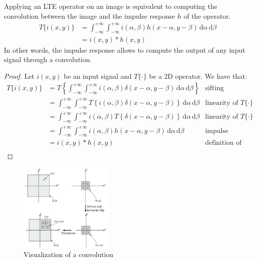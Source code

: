 \begin{theorem} 
    Applying an LTE operator on an image is equivalent to computing the convolution between the image and the impulse response $h$ of the operator.
    \[ 
        \begin{split}
            T\{ i(x, y) \} &= \int_{-\infty}^{+\infty}\int_{-\infty}^{+\infty} i(\alpha, \beta) h(x-\alpha, y-\beta) \,\text{d}\alpha\,\text{d}\beta \\
                &= i(x, y) * h(x, y) 
        \end{split}
    \]
    In other words, the impulse response allows to compute the output of any input signal through a convolution.
    \begin{proof}
        Let $i(x, y)$ be an input signal and $T\{ \cdot \}$ be a 2D operator.
        We have that:
        \begin{align*}
            T\{ i(x, y) \} 
                &= T\left\{ \int_{-\infty}^{+\infty}\int_{-\infty}^{+\infty} i(\alpha, \beta) \delta(x-\alpha, y-\beta) \,\text{d}\alpha\,\text{d}\beta \right\} 
                & \text{sifting property} \\
                &= \int_{-\infty}^{+\infty}\int_{-\infty}^{+\infty} T\left\{ i(\alpha, \beta) \delta(x-\alpha, y-\beta) \right\} \,\text{d}\alpha\,\text{d}\beta
                & \text{linearity of $T\{ \cdot \}$} \\
                &= \int_{-\infty}^{+\infty}\int_{-\infty}^{+\infty} i(\alpha, \beta) T\left\{ \delta(x-\alpha, y-\beta) \right\} \,\text{d}\alpha\,\text{d}\beta
                & \text{linearity of $T\{ \cdot \}$} \\
                &= \int_{-\infty}^{+\infty}\int_{-\infty}^{+\infty} i(\alpha, \beta) h(x-\alpha, y-\beta) \,\text{d}\alpha\,\text{d}\beta
                & \text{impulse response} \\
                &= i(x, y) * h(x, y) 
                & \text{definition of convolution} \\
        \end{align*}  
    \end{proof}
\end{theorem}

\begin{figure}[H]
    \centering
    \includegraphics[width=0.4\textwidth]{./img/_convolution_graphical.pdf}
    \caption{Visualization of a convolution}
\end{figure}



